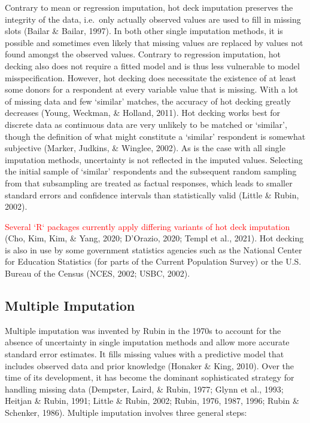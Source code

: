 \documentclass[12pt,econ]{sources/authesis}
\begin{document}
Contrary to mean or regression imputation, hot deck imputation preserves the integrity of the data, i.e.~only actually observed values are used to fill in missing slots (Bailar \& Bailar, 1997). In both other single imputation methods, it is possible and sometimes even likely that missing values are replaced by values not found amongst the observed values. Contrary to regression imputation, hot decking also does not require a fitted model and is thus less vulnerable to model misspecification. However, hot decking does necessitate the existence of at least some donors for a respondent at every variable value that is missing. With a lot of missing data and few `similar' matches, the accuracy of hot decking greatly decreases (Young, Weckman, \& Holland, 2011). Hot decking works best for discrete data as continuous data are very unlikely to be matched or `similar', though the definition of what might constitute a `similar' respondent is somewhat subjective (Marker, Judkins, \& Winglee, 2002). As is the case with all single imputation methods, uncertainty is not reflected in the imputed values. Selecting the initial sample of `similar' respondents and the subsequent random sampling from that subsampling are treated as factual responses, which leads to smaller standard errors and confidence intervals than statistically valid (Little \& Rubin, 2002).

\textcolor{red}{Several `R` packages currently apply differing variants of hot deck imputation} (Cho, Kim, Kim, \& Yang, 2020; D'Orazio, 2020; Templ et al., 2021). Hot decking is also in use by some government statistics agencies such as the National Center for Education Statistics (for parts of the Current Population Survey) or the U.S. Bureau of the Census (NCES, 2002; USBC, 2002).

\hypertarget{ordmiss-theory-multimpute}{%
\subsection{Multiple Imputation}\label{ordmiss-theory-multimpute}}

Multiple imputation was invented by Rubin in the 1970s to account for the absence of uncertainty in single imputation methods and allow more accurate standard error estimates. It fills missing values with a predictive model that includes observed data and prior knowledge (Honaker \& King, 2010). Over the time of its development, it has become the dominant sophisticated strategy for handling missing data (Dempster, Laird, \& Rubin, 1977; Glynn et al., 1993; Heitjan \& Rubin, 1991; Little \& Rubin, 2002; Rubin, 1976, 1987, 1996; Rubin \& Schenker, 1986). Multiple imputation involves three general steps:
\end{document}
